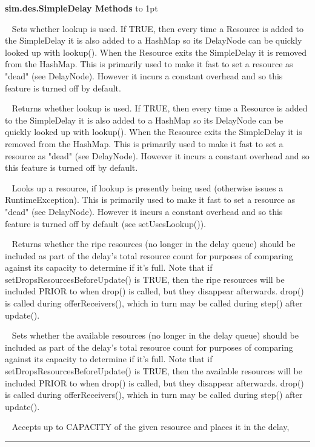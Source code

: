 \documentclass[twoside,10pt]{article}
\newcommand\class[1]{\index{Classes!{#1}}\textsf{#1}}
\newcommand*{\xfill}[1][0pt]{%
	\cleaders
		\hbox to 1pt{\hss
			\raisebox{#1}{\rule{1.2pt}{0.4pt}}%
			\hss}\hfill}
\newenvironment{methods}[1]{
\vspace{1.0em}\noindent\textsf{\textbf{#1 Methods}}\quad \xfill[0.5ex]
\vspace{-0.25em}
\begin{description}
\small}
{\end{description}\hrule\vspace{1.5em}}
\newcommand{\mthd}[1]{\item[{\sf #1}]~\newline}
\begin{document}
\begin{methods}{\class{sim.des.SimpleDelay}}
\mthd{public void setUsesLookup(boolean val)}
Sets whether lookup is used.  If TRUE, then every time a Resource is added to the SimpleDelay it is also
    	added to a HashMap so its DelayNode can be quickly looked up with lookup().  When the Resource exits
    	the SimpleDelay it is removed from the HashMap.  This is primarily used to make it fast to
    	set a resource as "dead" (see DelayNode). However it incurs a constant overhead and so this feature
    	is turned off by default.
\mthd{public boolean getUsesLookup()}
Returns whether lookup is used.  If TRUE, then every time a Resource is added to the SimpleDelay it is also
    	added to a HashMap so its DelayNode can be quickly looked up with lookup().  When the Resource exits
    	the SimpleDelay it is removed from the HashMap.  This is primarily used to make it fast to
    	set a resource as "dead" (see DelayNode). However it incurs a constant overhead and so this feature
    	is turned off by default.
\mthd{public DelayNode lookup(Resource resource)}
 Looks up a resource, if lookup is presently being used (otherwise issues a RuntimeException).
    	This is primarily used to make it fast to
    	set a resource as "dead" (see DelayNode). However it incurs a constant overhead and so this feature
    	is turned off by default (see setUsesLookup()).         
\mthd{public boolean getIncludesAvailableResourcesInTotal()}
Returns whether the ripe resources (no longer in the delay queue) should be included as part of the delay's
    	total resource count for purposes of comparing against its capacity to determine if it's full. Note that
    	if setDropsResourcesBeforeUpdate() is TRUE, then the ripe resources will be included PRIOR to when drop()
    	is called, but they disappear afterwards.  drop() is called during offerReceivers(), which in turn may
    	be called during step() after update().
\mthd{public void setIncludesAvailableResourcesInTotal(boolean val)}
Sets whether the available resources (no longer in the delay queue) should be included as part of the delay's
    	total resource count for purposes of comparing against its capacity to determine if it's full. Note that
    	if setDropsResourcesBeforeUpdate() is TRUE, then the available resources will be included PRIOR to when drop()
    	is called, but they disappear afterwards.  drop() is called during offerReceivers(), which in turn may
    	be called during step() after update().
\mthd{public boolean accept(Provider provider, Resource amount, double atLeast, double atMost)}
Accepts up to CAPACITY of the given resource and places it in the delay,

\end{methods}
\end{document}
